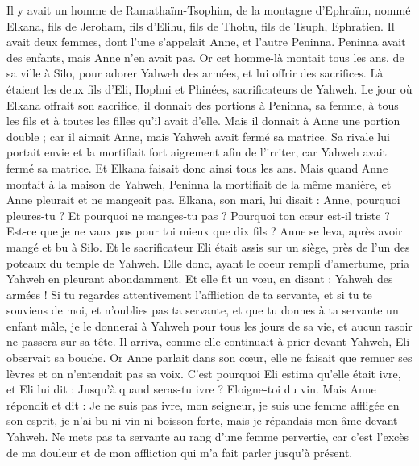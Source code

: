 \begin{multicols}{2}
\VerseOne{}Il y avait un homme de Ramathaïm-Tsophim, de la montagne d'Ephraïm, nommé Elkana, fils de Jeroham, fils d'Elihu, fils de Thohu, fils de Tsuph, Ephratien.
Il avait deux femmes, dont l'une s'appelait Anne, et l'autre Peninna. Peninna avait des enfants, mais Anne n'en avait pas.
Or cet homme-là montait tous les ans, de sa ville à Silo, pour adorer Yahweh des armées, et lui offrir des sacrifices. Là étaient les deux fils d’Eli, Hophni et Phinées, sacrificateurs de Yahweh.
Le jour où Elkana offrait son sacrifice, il donnait des portions à Peninna, sa femme, à tous les fils et à toutes les filles qu'il avait d'elle.
Mais il donnait à Anne une portion double ; car il aimait Anne, mais Yahweh avait fermé sa matrice.
Sa rivale lui portait envie et la mortifiait fort aigrement afin de l’irriter, car Yahweh avait fermé sa matrice.
Et Elkana faisait donc ainsi tous les ans. Mais quand Anne montait à la maison de Yahweh, Peninna la mortifiait de la même manière, et Anne pleurait et ne mangeait pas.
Elkana, son mari, lui disait : Anne, pourquoi pleures-tu ? Et pourquoi ne manges-tu pas ? Pourquoi ton cœur est-il triste ? Est-ce que je ne vaux pas pour toi mieux que dix fils ?
Anne se leva, après avoir mangé et bu à Silo. Et le sacrificateur Eli était assis sur un siège, près de l’un des poteaux du temple de Yahweh.
Elle donc, ayant le coeur rempli d'amertume, pria Yahweh en pleurant abondamment.
Et elle fit un vœu, en disant : Yahweh des armées ! Si tu regardes attentivement l'affliction de ta servante, et si tu te souviens de moi, et n'oublies pas ta servante, et que tu donnes à ta servante un enfant mâle, je le donnerai à Yahweh pour tous les jours de sa vie, et aucun rasoir ne passera sur sa tête.
Il arriva, comme elle continuait à prier devant Yahweh, Eli observait sa bouche.
Or Anne parlait dans son cœur, elle ne faisait que remuer ses lèvres et on n'entendait pas sa voix. C’est pourquoi Eli estima qu'elle était ivre,
et Eli lui dit : Jusqu'à quand seras-tu ivre ? Eloigne-toi du vin.
Mais Anne répondit et dit : Je ne suis pas ivre, mon seigneur, je suis une femme affligée en son esprit, je n'ai bu ni vin ni boisson forte, mais je répandais mon âme devant Yahweh.
Ne mets pas ta servante au rang d'une femme pervertie, car c'est l’excès de ma douleur et de mon affliction qui m’a fait parler jusqu'à présent.

\end{multicols}
